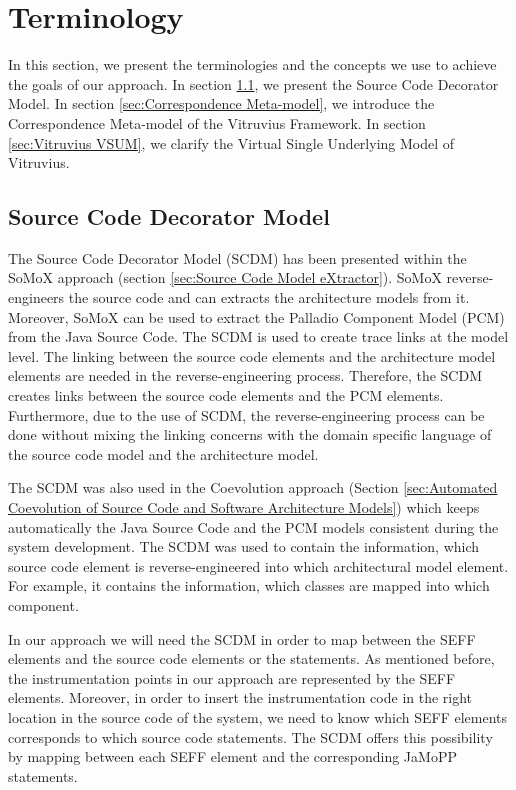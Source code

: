 \section{Terminology}
\label{sec:Terminology}
In this section, we present the terminologies and the concepts we use to achieve the goals of our approach. In section \ref{sec:Source Code Decorator Model}, we present the Source Code Decorator Model. In section \ref{sec:Correspondence Meta-model}, we introduce the Correspondence Meta-model of the Vitruvius Framework. In section \ref{sec:Vitruvius VSUM}, we clarify the Virtual Single Underlying Model of Vitruvius. 

\subsection{Source Code Decorator Model}
\label{sec:Source Code Decorator Model}

The Source Code Decorator Model (SCDM) has been presented within the SoMoX approach (section \ref{sec:Source Code Model eXtractor}).  SoMoX reverse-engineers the source code and can extracts the architecture models from it. Moreover, SoMoX can be used to extract the Palladio Component Model (PCM) from the Java Source Code. The SCDM is used to create trace links at the model level. The linking between the source code elements and the architecture model elements are needed in the reverse-engineering process. Therefore, the SCDM creates links between the source code elements and the PCM elements. Furthermore, due to the use of SCDM, the reverse-engineering process can be done without mixing the linking concerns with the domain specific language of the source code model and the architecture model.

The SCDM was also used in the Coevolution approach (Section \ref{sec:Automated Coevolution of Source Code and Software Architecture Models}) which keeps automatically the Java Source Code and the PCM models consistent during the system development. The SCDM was used to contain the information, which source code element is reverse-engineered into which architectural model element. For example, it contains the information, which classes are mapped into which component.

In our approach we will need the SCDM in order to map between the SEFF elements and the source code elements or the statements. As mentioned before, the instrumentation points in our approach are represented by the SEFF elements. Moreover, in order to insert the instrumentation code in the right location in the source code of the system, we need to know which SEFF elements corresponds to which source code statements. The SCDM offers this possibility by mapping between each SEFF element and the corresponding JaMoPP statements. 

